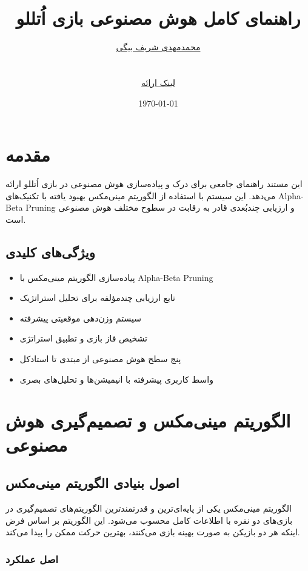 \documentclass[12pt]{article}
\title{\Huge\bfseries راهنمای کامل هوش مصنوعی بازی اُتللو\\
	\vspace{0.5cm}
	\Large\lr{Complete Guide to Othello AI with Minimax Algorithm}}
\author{\href{https://github.com/MohammadMahdi-Sharifbeigy}{محمدمهدی شریف بیگی} \\ 
	\lr{MohammadMahdi Sharifbeigy}\\
	\small \lr{Advanced AI Implementation with Enhanced Minimax}\\
	\href{https://cdn.imgurl.ir/uploads/k417535_402300068-MINMAX.mp4}{لینک ارائه}}
\date{\today}
\begin{document}
	
	\maketitle
	
	\tableofcontents
	\newpage
	
	\section{مقدمه}
	
	این مستند راهنمای جامعی برای درک و پیاده‌سازی هوش مصنوعی در بازی اُتللو ارائه می‌دهد. این سیستم با استفاده از الگوریتم مینی‌مکس بهبود یافته با تکنیک‌های Alpha-Beta Pruning و ارزیابی چندبُعدی قادر به رقابت در سطوح مختلف هوش مصنوعی است.
	
	\subsection{ویژگی‌های کلیدی}
	
	\begin{itemize}
		\item پیاده‌سازی الگوریتم مینی‌مکس با Alpha-Beta Pruning
		\item تابع ارزیابی چندمؤلفه برای تحلیل استراتژیک
		\item سیستم وزن‌دهی موقعیتی پیشرفته
		\item تشخیص فاز بازی و تطبیق استراتژی
		\item پنج سطح هوش مصنوعی از مبتدی تا استادکل
		\item واسط کاربری پیشرفته با انیمیشن‌ها و تحلیل‌های بصری
	\end{itemize}
	
	\section{الگوریتم مینی‌مکس و تصمیم‌گیری هوش مصنوعی}
	
	\subsection{اصول بنیادی الگوریتم مینی‌مکس}
	
	الگوریتم مینی‌مکس یکی از پایه‌ای‌ترین و قدرتمندترین الگوریتم‌های تصمیم‌گیری در بازی‌های دو نفره با اطلاعات کامل محسوب می‌شود. این الگوریتم بر اساس فرض اینکه هر دو بازیکن به صورت بهینه بازی می‌کنند، بهترین حرکت ممکن را پیدا می‌کند.
	
	\subsubsection{اصل عملکرد}
	
\end{document}
